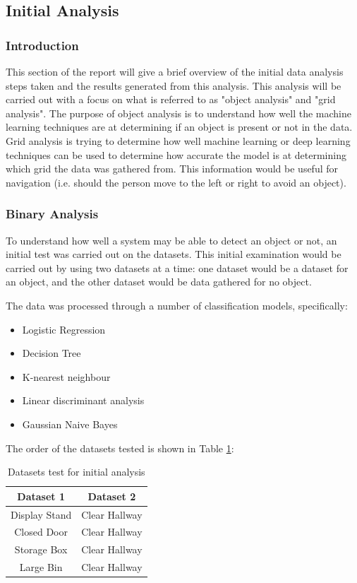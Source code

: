 \documentclass[conference]{IEEEtran}
\begin{document}
\subsection{Initial Analysis}
\subsubsection{Introduction}
This section of the report will give a brief overview of the initial data analysis steps taken and the results generated from this analysis. This analysis will be carried out with a focus on what is referred to as "object analysis" and "grid analysis". The purpose of object analysis is to understand how well the machine learning techniques are at determining if an object is present or not in the data. Grid analysis is trying to determine how well machine learning or deep learning techniques can be used to determine how accurate the model is at determining which grid the data was gathered from. This information would be useful for navigation (i.e. should the person move to the left or right to avoid an object).

\subsubsection{Binary Analysis}
To understand how well a system may be able to detect an object or not, an initial test was carried out on the datasets. This initial examination would be carried out by using two datasets at a time: one dataset would be a dataset for an object, and the other dataset would be data gathered for no object. 

The data was processed through a number of classification models, specifically:
\begin{itemize}
    \item Logistic Regression
    \item Decision Tree
    \item K-nearest neighbour
    \item Linear discriminant analysis
    \item Gaussian Naive Bayes
\end{itemize}

The order of the datasets tested is shown in Table \ref{table:2}:
\begin{table}[ht]
\centering
\begin{tabular}{||c c||} 
 \hline
 Dataset 1 & Dataset 2  \\ [0.5ex] 
 \hline\hline
 Display Stand & Clear Hallway  \\ 
 \hline
 Closed Door & Clear Hallway \\
 \hline
 Storage Box & Clear Hallway \\
 \hline
 Large Bin & Clear Hallway \\ [1ex] 
 \hline
\end{tabular}
\caption{Datasets test for initial analysis}
\label{table:2}
\end{table}
\end{document}
